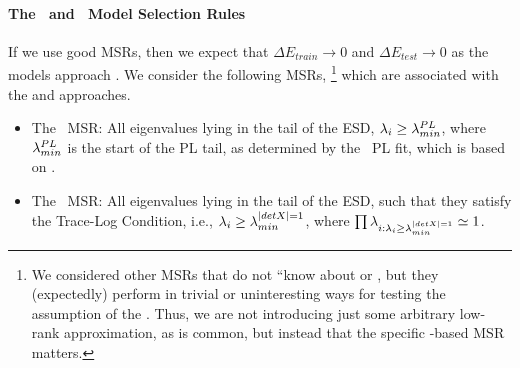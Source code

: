 \paragraph{The \POWERLAW~and \TRACELOG~Model Selection Rules}
If we use good MSRs, then we expect that $\Delta E_{train}\to 0$ and $\Delta E_{test}\to 0$ as the models approach \IdealLearning. 
%
We consider the following MSRs,%
\footnote{We considered other MSRs that do not ``know about \HTSR or \SETOL, but they (expectedly) perform in trivial or uninteresting ways for testing the assumption of the \EffectiveCorrelationSpace.  Thus, we are not introducing just some arbitrary low-rank approximation, as is common, but instead that the specific \SETOL-based MSR matters.} 
which are associated with the \HTSR and \SETOL approaches.
\begin{itemize}
\item 
The \POWERLAW~MSR: 
All eigenvalues lying in the tail of the ESD, 
$\lambda_i \ge \lambda^{PL}_{min}$, where $\lambda^{PL}_{min}$ is the start of the PL tail, as determined by the \WW~PL fit, which is based on \cite{CSN09_powerlaw}.
\item 
The \TRACELOG~MSR: 
All eigenvalues lying in the tail of the ESD, 
such that they satisfy the Trace-Log Condition, i.e., $\lambda_{i}\ge \lambda^{\vert detX\vert=1}_{min}$, where $\prod\lambda_{i:\lambda_i \ge \lambda^{\vert detX\vert=1}_{min}}\simeq 1$.
\end{itemize}


%



